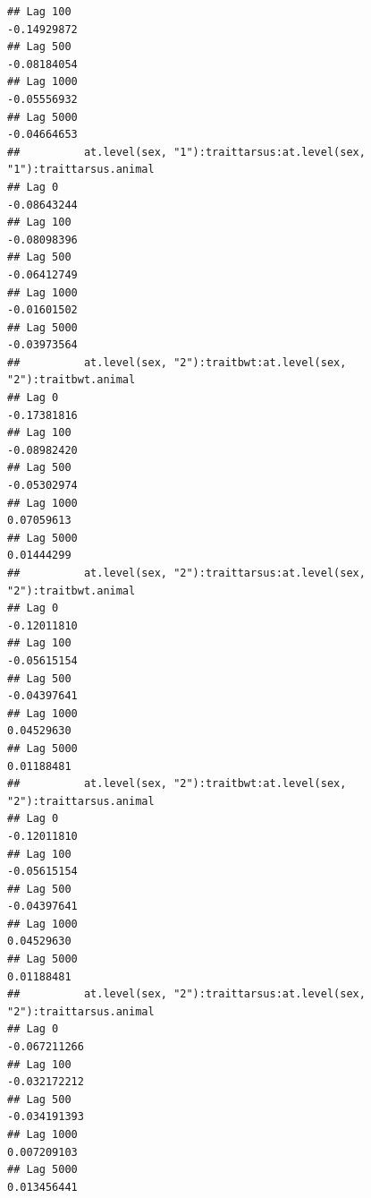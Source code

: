 \documentclass[
  12pt,
]{book}
\begin{document}
\begin{verbatim}
## Lag 100                                                        -0.14929872
## Lag 500                                                        -0.08184054
## Lag 1000                                                       -0.05556932
## Lag 5000                                                       -0.04664653
##          at.level(sex, "1"):traittarsus:at.level(sex, "1"):traittarsus.animal
## Lag 0                                                             -0.08643244
## Lag 100                                                           -0.08098396
## Lag 500                                                           -0.06412749
## Lag 1000                                                          -0.01601502
## Lag 5000                                                          -0.03973564
##          at.level(sex, "2"):traitbwt:at.level(sex, "2"):traitbwt.animal
## Lag 0                                                       -0.17381816
## Lag 100                                                     -0.08982420
## Lag 500                                                     -0.05302974
## Lag 1000                                                     0.07059613
## Lag 5000                                                     0.01444299
##          at.level(sex, "2"):traittarsus:at.level(sex, "2"):traitbwt.animal
## Lag 0                                                          -0.12011810
## Lag 100                                                        -0.05615154
## Lag 500                                                        -0.04397641
## Lag 1000                                                        0.04529630
## Lag 5000                                                        0.01188481
##          at.level(sex, "2"):traitbwt:at.level(sex, "2"):traittarsus.animal
## Lag 0                                                          -0.12011810
## Lag 100                                                        -0.05615154
## Lag 500                                                        -0.04397641
## Lag 1000                                                        0.04529630
## Lag 5000                                                        0.01188481
##          at.level(sex, "2"):traittarsus:at.level(sex, "2"):traittarsus.animal
## Lag 0                                                            -0.067211266
## Lag 100                                                          -0.032172212
## Lag 500                                                          -0.034191393
## Lag 1000                                                          0.007209103
## Lag 5000                                                          0.013456441

\end{verbatim}
\end{document}
